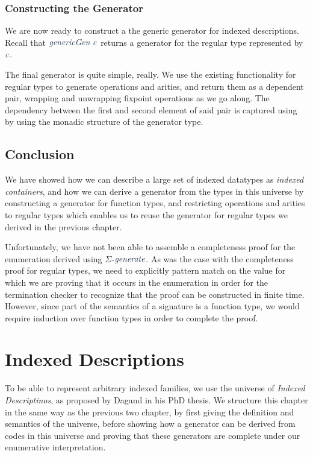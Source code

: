 \documentclass[a4paper,msc,twosized=semi]{uustthesis}
\newcommand{\includeagda}[2]{\vspace*{-0.25cm}\begin{center}{\fontsize{12}{14}\agdafont\ExecuteMetaData[../src/chap0#1/latex/code.tex]{#2}}\end{center}\vspace*{-0.25cm}}
\newcommand*{\mathcolor}{}
\def\mathcolor#1#{\mathcoloraux{#1}}
\newcommand*{\mathcoloraux}[3]{%
  \protect\leavevmode
  \begingroup
    \color#1{#2}#3%
  \endgroup
}
\newcommand{\HSVar}[1]{\mathcolor{hsblue5}{\mathit{#1}}}
\begin{document}
\subsection{Constructing the Generator}

  We are now ready to construct a the generic generator for indexed descriptions. 
  Recall that \ensuremath{\HSVar{genericGen}\;\HSVar{c}} returns a generator for the regular type represented by \ensuremath{\HSVar{c}}. 

\includeagda{6}{gensignature}

  The final generator is quite simple, really. We use the existing functionality for 
  regular types to generate operations and arities, and return them as a dependent 
  pair, wrapping and unwrapping fixpoint operations as we go along. The dependency 
  between the first and second element of said pair is captured using by using the 
  monadic structure of the generator type.

\section*{Conclusion}

  We have showed how we can describe a large set of indexed datatypes as \emph{indexed 
  containers}, and how we can derive a generator from the types in this universe by 
  constructing a generator for function types, and restricting operations and arities 
  to regular types which enables us to reuse the generator for regular types we 
  derived in the previous chapter. 

  Unfortunately, we have not been able to assemble a completeness proof for the 
  enumeration derived using $\Sigma$-\ensuremath{\HSVar{generate}}. As was the case with the completeness 
  proof for regular types, we need to explicitly pattern match on the value for which 
  we are proving that it occurs in the enumeration in order for the termination 
  checker to recognize that the proof can be constructed in finite time. However, 
  since part of the semantics of a signature is a function type, we would require 
  induction over function types in order to complete the proof. 

\chapter{Indexed Descriptions}

To be able to represent arbitrary indexed families, we use the universe of \emph
{Indexed Descriptinos}, as proposed by Dagand \cite{dagand2013cosmology} in his PhD 
thesis. We structure this chapter in the same way as the previous two chapter, by 
first giving the definition and semantics of the universe, before showing how a 
generator can be derived from codes in this universe and proving that these generators 
are complete under our enumerative interpretation. 
\end{document}
